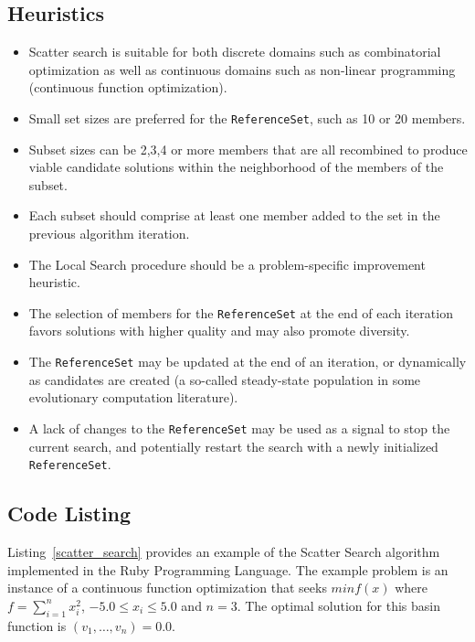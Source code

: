 \subsection{Heuristics}
\begin{itemize}
	\item Scatter search is suitable for both discrete domains such as combinatorial optimization as well as continuous domains such as non-linear programming (continuous function optimization).
	\item Small set sizes are preferred for the \texttt{ReferenceSet}, such as 10 or 20 members.
	\item Subset sizes can be 2,3,4 or more members that are all recombined to produce viable candidate solutions within the neighborhood of the members of the subset.
	\item Each subset should comprise at least one member added to the set in the previous algorithm iteration.
	\item The Local Search procedure should be a problem-specific improvement heuristic. 
	\item The selection of members for the \texttt{ReferenceSet} at the end of each iteration favors solutions with higher quality and may also promote diversity.
	\item The \texttt{ReferenceSet} may be updated at the end of an iteration, or dynamically as candidates are created (a so-called steady-state population in some evolutionary computation literature).
	\item A lack of changes to the \texttt{ReferenceSet} may be used as a signal to stop the current search, and potentially restart the search with a newly initialized \texttt{ReferenceSet}.	
\end{itemize}

\subsection{Code Listing}
Listing~\ref{scatter_search} provides an example of the Scatter Search algorithm implemented in the Ruby Programming Language. 
The example problem is an instance of a continuous function optimization that seeks $min f(x)$ where $f=\sum_{i=1}^n x_{i}^2$, $-5.0\leq x_i \leq 5.0$ and $n=3$. The optimal solution for this basin function is $(v_1,\ldots,v_{n})=0.0$.

